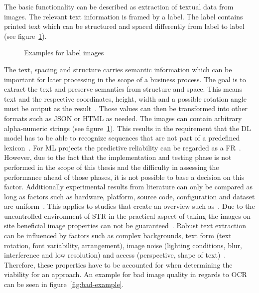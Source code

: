The basic functionality can be described as extraction of textual data from images.
The relevant text information is framed by a label.
The label contains printed text which can be structured and spaced differently from label to
label (see figure~\ref{fig:examples}).
\begin{figure}
    \centering
    \caption{Examples for label images\label{fig:examples}}
\end{figure}
The text, spacing and structure carries semantic information which can be important for later
processing in the scope of a business process.
The goal is to extract the text and preserve semantics from structure and space.
This means text and the respective coordinates, height, width and a possible rotation angle must
be output as the result~\cite{yang_learning_2021}.
Those values can then be transformed into other formats such as JSON or HTML as needed.
The images can contain arbitrary alpha-numeric strings (see figure~\ref{fig:examples}).
This results in the requirement that the \ac{DL} model has to be able to recognize sequences that
are not part of a predefined lexicon~\cite{ghosh_visual_2017}.
For \ac{ML} projects the predictive reliability can be regarded as a
\ac{FR}~\cite{vogelsang_requirements_2019}.
However, due to the fact that the implementation and testing phase is not performed in the scope of
this thesis and the difficulty in assessing the performance ahead of those phases, it is not
possible to base a decision on this factor.
Additionally experimental results from literature can only be compared as long as factors such as
hardware, platform, source code, configuration and dataset are uniform~\cite{arpteg_software_2018}.
This applies to studies that create an overview such as~\cite{chen_text_2021,long_scene_2021}.
Due to the uncontrolled environment of \ac{STR} in the practical aspect of taking the images on-site
beneficial image properties can not be guaranteed~\cite{chen_text_2021}.
Robust text extraction can be influenced by factors such as complex backgrounds, text form
(text rotation, font variability, arrangement), image noise (lighting conditions, blur,
interference and low resolution) and access (perspective, shape of
text)~\cite{oyedotun_deep_2015,ghosh_visual_2017,chen_text_2021}.
Therefore, these properties have to be accounted for when determining the viability for an approach.
An example for bad image quality in regards to \ac{OCR} can be seen in figure~\ref{fig:bad-example}.


